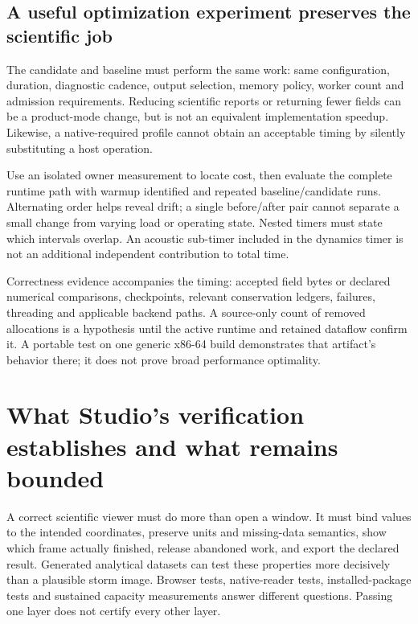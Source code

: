 \subsection{A useful optimization experiment preserves the scientific job}

The candidate and baseline must perform the same work: same configuration,
duration, diagnostic cadence, output selection, memory policy, worker count and
admission requirements. Reducing scientific reports or returning fewer fields
can be a product-mode change, but is not an equivalent implementation speedup.
Likewise, a native-required profile cannot obtain an acceptable timing by
silently substituting a host operation.

Use an isolated owner measurement to locate cost, then evaluate the complete
runtime path with warmup identified and repeated baseline/candidate runs.
Alternating order helps reveal drift; a single before/after pair cannot
separate a small change from varying load or operating state. Nested timers
must state which intervals overlap. An acoustic sub-timer included in the
dynamics timer is not an additional independent contribution to total time.

Correctness evidence accompanies the timing: accepted field bytes or declared
numerical comparisons, checkpoints, relevant conservation ledgers, failures,
threading and applicable backend paths. A source-only count of removed
allocations is a hypothesis until the active runtime and retained dataflow
confirm it. A portable test on one generic x86-64 build demonstrates that
artifact's behavior there; it does not prove broad performance optimality.

\section{What Studio's verification establishes and what remains bounded}
\label{architecture-studio-limits}

A correct scientific viewer must do more than open a window. It must bind
values to the intended coordinates, preserve units and missing-data semantics,
show which frame actually finished, release abandoned work, and export the
declared result. Generated analytical datasets can test these properties more
decisively than a plausible storm image. Browser tests, native-reader tests,
installed-package tests and sustained capacity measurements answer different
questions. Passing one layer does not certify every other layer.

